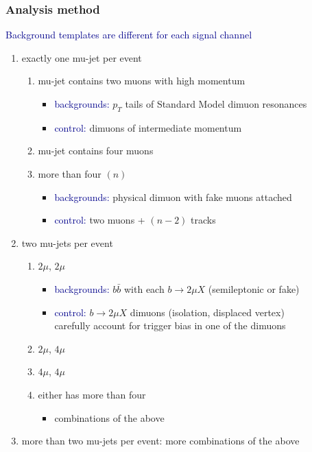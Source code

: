 \documentclass[compress]{beamer}
\begin{document}
\begin{frame}
\frametitle{Analysis method}
\textcolor{darkblue}{Background templates are different for each signal channel}
\begin{enumerate}
\item exactly one mu-jet per event
\begin{enumerate}
\item mu-jet contains two muons with high momentum
\begin{itemize}
\item \textcolor{darkblue}{backgrounds:} $p_T$ tails of Standard Model dimuon resonances
\item \textcolor{darkblue}{control:} dimuons of intermediate momentum
\end{itemize}

\item mu-jet contains four muons
\item more than four $(n)$
\begin{itemize}
\item \textcolor{darkblue}{backgrounds:} physical dimuon with fake
  muons attached
\item \textcolor{darkblue}{control:} two muons + $(n-2)$ tracks
\end{itemize}
\end{enumerate}

\item two mu-jets per event
\begin{enumerate}
\item $2\mu$, $2\mu$
\begin{itemize}
\item \textcolor{darkblue}{backgrounds:} $b\bar{b}$ with each $b \to 2\mu X$ (semileptonic or fake)
\item \textcolor{darkblue}{control:} $b \to 2\mu X$ dimuons (isolation, displaced vertex) \\
carefully account for trigger bias in one of the dimuons
\end{itemize}

\item $2\mu$, $4\mu$
\item $4\mu$, $4\mu$
\item either has more than four
\begin{itemize}
\item combinations of the above
\end{itemize}
\end{enumerate}

\item more than two mu-jets per event: {\scriptsize more combinations of the above}
\end{enumerate}
\end{frame}
\end{document}
